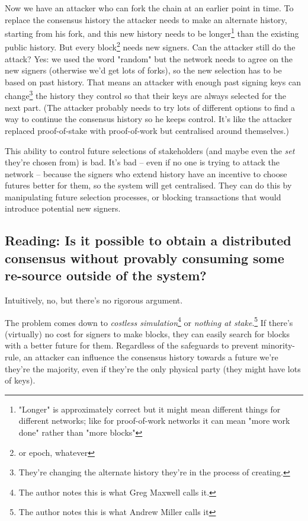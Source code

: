 \documentclass{article}
\begin{document}
Now we have an attacker who can fork the chain at an earlier point in time. To replace the consensus history the attacker needs to make an alternate history, starting from his fork, and this new history needs to be longer\footnote{"Longer" is approximately correct but it might mean different things for different networks; like for proof-of-work networks it can mean "more work done" rather than "more blocks"} than the existing public history. But every block\footnote{or epoch, whatever} needs new signers. Can the attacker still do the attack? Yes: we used the word "random" but the network needs to agree on the new signers (otherwise we'd get lots of forks), so the new selection has to be based on past history. That means an attacker with enough past signing keys can change\footnote{They're changing the alternate history they're in the process of creating.} the history they control so that their keys are always selected for the next part. (The attacker probably needs to try lots of different options to find a way to continue the consensus history so he keeps control. It's like the attacker replaced proof-of-stake with proof-of-work but centralised around themselves.)

This ability to control future selections of stakeholders (and maybe even the \emph{set} they're chosen from) is bad. It's bad -- even if no one is trying to attack the network -- because the signers who extend history have an incentive to choose futures better for them, so the system will get centralised. They can do this by manipulating future selection processes, or blocking transactions that would introduce potential new signers.

\subsection{Reading: Is it possible to obtain a distributed consensus without provably consuming some re-source outside of the system?}

Intuitively, no, but there's no rigorous argument.

The problem comes down to \emph{costless simulation}\footnote{The author notes this is what Greg Maxwell calls it.} or \emph{nothing at stake}.\footnote{The author notes this is what Andrew Miller calls it}
If there's (virtually) no cost for signers to make blocks, they can easily search for blocks with a better future for them. Regardless of the safeguards to prevent minority-rule, an attacker can influence the consensus history towards a future we're they're the majority, even if they're the only physical party (they might have lots of keys).
\end{document}
